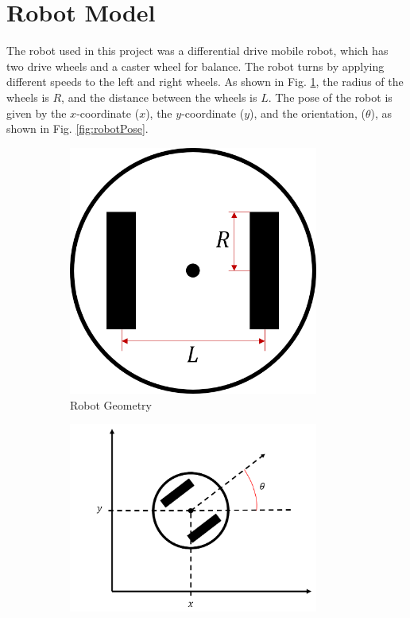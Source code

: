 \section{Robot Model}\label{sec:robotModel}
The robot used in this project was a differential drive mobile robot, which has
two drive wheels and a caster wheel for balance. The robot turns by applying
different speeds to the left and right wheels. As shown in Fig.
\ref{fig:robotGeometry}, the radius of the wheels is $R$, and the distance
between the wheels is $L$. The pose of the robot is given by the $x$-coordinate
($x$), the $y$-coordinate ($y$), and the orientation, ($\theta$), as shown in
Fig. \ref{fig:robotPose}. %
%
\begin{figure}
    \centering
    \begin{subfigure}{0.3\textwidth}
        \centering
        \includegraphics[width=0.9\textwidth]{figs/img/robotGeometry.png}
        \caption{Robot Geometry}
        \label{fig:robotGeometry}
    \end{subfigure}%
    \begin{subfigure}{0.7\textwidth}
        \centering
        \includegraphics[width=0.9\textwidth]{figs/img/robotPose.png}

\end{subfigure}
\end{figure}
